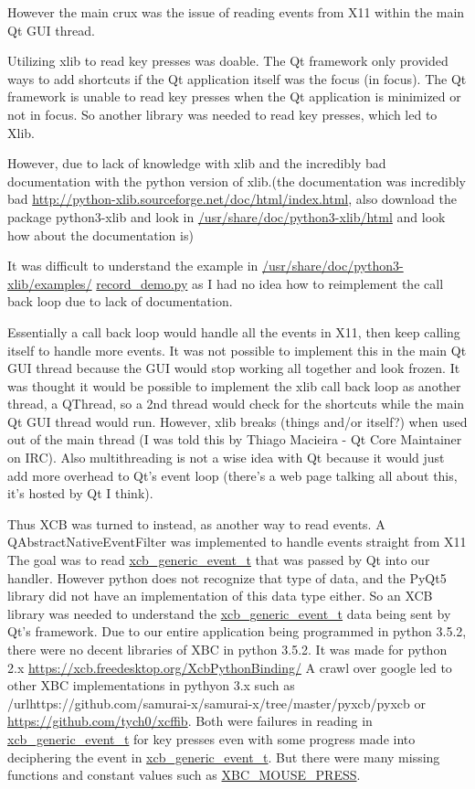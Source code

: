 \documentclass[12pt]{article}
\begin{document}
However the main crux was the issue of reading events from X11 within the main Qt GUI thread.

Utilizing xlib to read key presses was doable.
The Qt framework only provided ways to add shortcuts if the Qt application itself was the focus (in focus).
The Qt framework is unable to read key presses when the Qt application is minimized or not in focus.
So another library was needed to read key presses, which led to Xlib.

However, due to lack of knowledge with xlib and the incredibly bad documentation with the python version of xlib.(the documentation was incredibly bad \url{http://python-xlib.sourceforge.net/doc/html/index.html}, also download the package python3-xlib and look in \url{/usr/share/doc/python3-xlib/html} and look how about the documentation is)

It was difficult to understand the example in \url{/usr/share/doc/python3-xlib/examples/}
\url{record_demo.py} as I had no idea how to reimplement the call back loop due to lack of documentation.

Essentially a call back loop would handle all the events in X11, then keep calling itself to handle more events.
It was not possible to implement this in the main Qt GUI thread because the GUI would stop working all together and look frozen.
It was thought it would be possible to implement the xlib call back loop as another thread, a QThread, so a 2nd thread would check for the shortcuts while the main Qt GUI thread would run.
However, xlib breaks (things and/or itself?) when used out of the main thread (I was told this by Thiago Macieira - Qt Core Maintainer on IRC).
Also multithreading is not a wise idea with Qt because it would just add more overhead to Qt's event loop (there's a web page talking all about this, it's hosted by Qt I think).

Thus XCB was turned to instead, as another way to read events.
A QAbstractNativeEventFilter was implemented to handle events straight from X11
The goal was to read \url{xcb_generic_event_t} that was passed by Qt into our handler.
However python does not recognize that type of data, and the PyQt5 library did not have an implementation of this data type either.
So an XCB library was needed to understand the \url{xcb_generic_event_t} data being sent by Qt's framework.
Due to our entire application being programmed in python 3.5.2, there were no decent libraries of XBC in python 3.5.2.
It was made for python 2.x
\url{https://xcb.freedesktop.org/XcbPythonBinding/}
A crawl over google led to other XBC implementations in pythyon 3.x such as /url{https://github.com/samurai-x/samurai-x/tree/master/pyxcb/pyxcb} or \url{https://github.com/tych0/xcffib}.
Both were failures in reading in \url{xcb_generic_event_t} for key presses even with some progress made into deciphering the event in \url{xcb_generic_event_t}.
But there were many missing functions and constant values such as \url{XBC_MOUSE_PRESS}.
\end{document}
